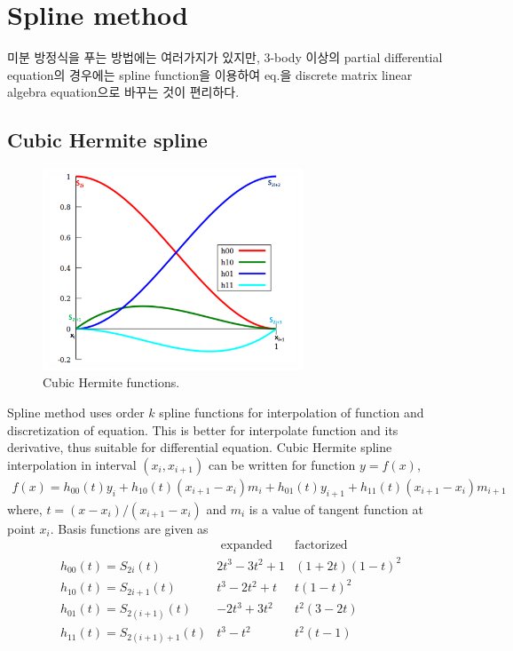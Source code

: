 \documentclass[10pt]{article}
\newcommand{\bea}{\begin{eqnarray}}
\newcommand{\eea}{\end{eqnarray}}
\begin{document}
\section{Spline method}



미분 방정식을 푸는 방법에는 여러가지가 있지만, 3-body 이상의
partial differential equation의 경우에는 spline function을 
이용하여 eq.을 discrete matrix linear algebra equation으로 
바꾸는 것이 편리하다.

\subsection{Cubic Hermite spline}
\begin{figure}[h!]
\begin{center}
\includegraphics[height=60mm]{CubicHermite1.png}
\end{center}
\caption{Cubic Hermite functions.}
\label{fig:spline}
\end{figure}
Spline method uses order $k$ spline functions for
interpolation of function and discretization
of equation. This is better for 
interpolate function and its derivative, thus
suitable for differential equation.
Cubic Hermite spline interpolation in interval $(x_i,x_{i+1})$
can be written for function $y=f(x)$, 
\bea
f(x)=h_{00}(t)y_i+h_{10}(t)(x_{i+1}-x_i)m_i
    +h_{01}(t)y_{i+1}+h_{11}(t)(x_{i+1}-x_i) m_{i+1} 
\eea 
where, $t=(x-x_i)/(x_{i+1}-x_i)$ and 
$m_i$ is a value of tangent function at point $x_i$.
Basis functions are given as
\begin{equation}
\begin{array}{l|l|l}
           &\mbox{ expanded}& \mbox{factorized} \\
           \hline 
 h_{00}(t)=S_{2i}(t) & 2t^3-3t^2+1    & (1+2t)(1-t)^2     \\
 h_{10}(t)=S_{2i+1}(t) & t^3-2t^2+t     & t(1-t)^2          \\
 h_{01}(t)=S_{2(i+1)}(t) & -2t^3+3t^2     & t^2(3-2t)         \\
 h_{11}(t)=S_{2(i+1)+1}(t) & t^3-t^2        & t^2(t-1)\\
\end{array} 
\end{equation}
\end{document}
